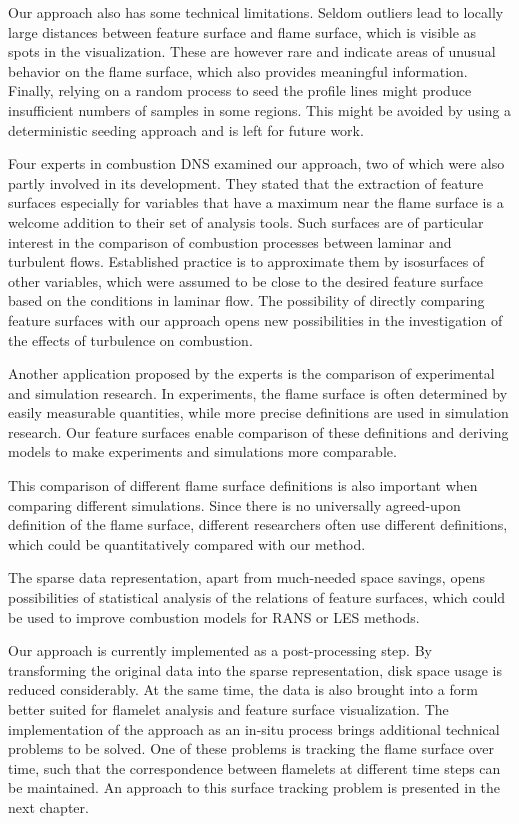 %
Our approach also has some technical limitations.
%
Seldom outliers lead to locally large distances between feature surface and
flame surface, which is visible as spots in the visualization.
%
These are however rare and indicate areas of unusual behavior on the flame
surface, which also provides meaningful information.
%
%
Finally, relying on a random process to seed the profile lines might produce
insufficient numbers of samples in some regions.
%
This might be avoided by using a deterministic seeding approach and is left for
future work.
%

%
Four experts in combustion \ac{DNS} examined our approach, two of which were
also partly involved in its development.
%
They stated that the extraction of feature surfaces especially for variables
that have a maximum near the flame surface is a welcome addition to their set of
analysis tools.
%
Such surfaces are of particular interest in the comparison of combustion
processes between laminar and turbulent flows.
%
Established practice is to approximate them by isosurfaces of other variables,
which were assumed to be close to the desired feature surface based on the
conditions in laminar flow.
%
The possibility of directly comparing feature surfaces with our approach opens
new possibilities in the investigation of the effects of turbulence on
combustion.
%

%
Another application proposed by the experts is the comparison of experimental
and simulation research.
%
In experiments, the flame surface is often determined by easily measurable
quantities, while more precise definitions are used in simulation research.
%
Our feature surfaces enable comparison of these definitions and deriving models
to make experiments and simulations more comparable.
%

%
This comparison of different flame surface definitions is also important when
comparing different simulations.
%
Since there is no universally agreed-upon definition of the flame surface,
different researchers often use different definitions, which could be
quantitatively compared with our method.
%

%
The sparse data representation, apart from much-needed space savings, opens
possibilities of statistical analysis of the relations of feature surfaces,
which could be used to improve combustion models for \ac{RANS} or \ac{LES}
methods.
%

%
Our approach is currently implemented as a post-processing step. By transforming
the original data into the sparse representation, disk space usage is reduced
considerably.
%
At the same time, the data is also brought into a form better suited for
flamelet analysis and feature surface visualization.
%
The implementation of the approach as an in-situ process brings additional
technical problems to be solved.
%
One of these problems is tracking the flame surface over time, such that the
correspondence between flamelets at different time steps can be maintained.
%
An approach to this surface tracking problem is presented in the next chapter.
%

